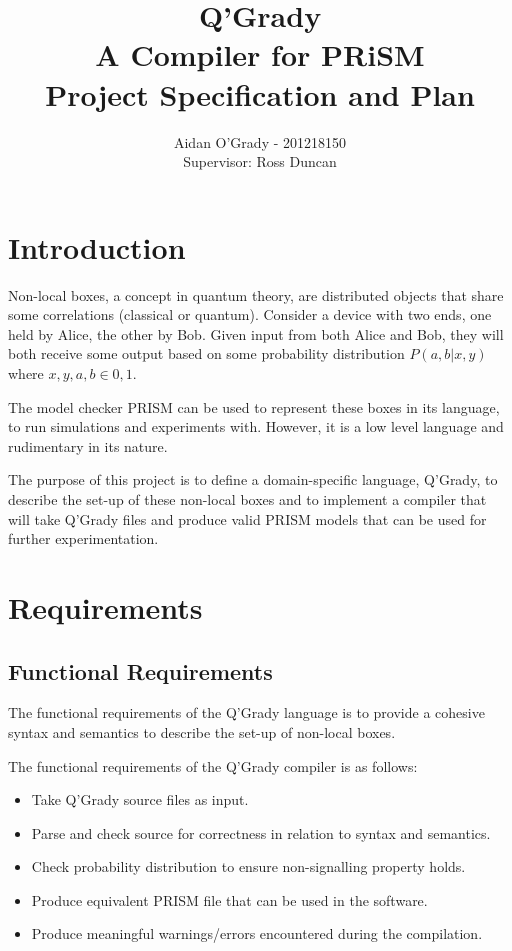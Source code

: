 \documentclass[11pt, a4paper]{article}
\begin{document}
\title{Q'Grady \\A Compiler for PRiSM \\
\large{Project Specification and Plan}}
\author{Aidan O'Grady - 201218150\\Supervisor: Ross Duncan}
\date{}
\maketitle

\section{Introduction} %
\label{sec:introduction}
Non-local boxes, a concept in quantum theory, are distributed objects that share
some correlations (classical or quantum). Consider a device with two ends, one
held by Alice, the other by Bob. Given input from both Alice and Bob, they will
both receive some output based on some probability distribution \(P(a,b|x,y)\)
where \(x,y,a,b \in {0,1}\).

The model checker PRISM can be used to represent these boxes in its language,
to run simulations and experiments with. However, it is a low level language and
rudimentary in its nature.

The purpose of this project is to define a domain-specific language, Q'Grady, to
describe the set-up of these non-local boxes and to implement a compiler that
will take Q'Grady files and produce valid PRISM models that can be used for
further experimentation.


\section{Requirements} %
\label{sec:requirements}
\subsection{Functional Requirements} %
\label{sub:functional_requirements}
The functional requirements of the Q'Grady language is to provide a cohesive
syntax and semantics to describe the set-up of non-local boxes.

The functional requirements of the Q'Grady compiler is as follows:
\begin{itemize}
    \item Take Q'Grady source files as input.
    \item Parse and check source for correctness in relation to syntax and
    semantics.
    \item Check probability distribution to ensure non-signalling property
    holds.
    \item Produce equivalent PRISM file that can be used in the software.
    \item Produce meaningful warnings/errors encountered during the
    compilation.
\end{itemize}
\end{document}
